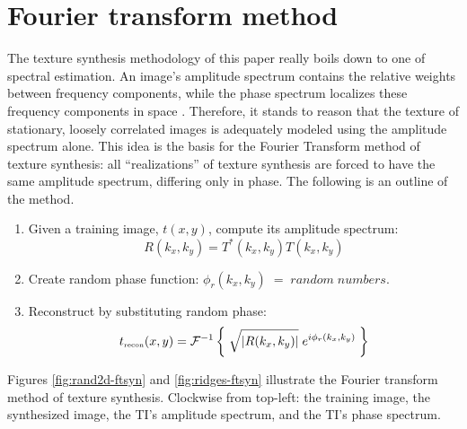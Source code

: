 \section{ Fourier transform method }

	The texture synthesis methodology of this paper really boils down to one of 
	spectral estimation.  An image's amplitude spectrum contains the relative weights 
	between frequency components, while the phase spectrum localizes these frequency 
	components in space {\small \cite[]{castleman}}.   Therefore, it stands to reason that 
	the texture 
	of stationary, loosely correlated images is adequately modeled using the amplitude 
	spectrum alone.  This idea is the basis for the Fourier Transform method of	texture 
	synthesis: all ``realizations'' of texture synthesis are forced to have the same 
	amplitude spectrum, differing only in phase.  The following is an outline of the
	method.

	\begin{enumerate}
		\item Given a training image, $t(x,y)$, compute its amplitude spectrum: 
			\begin{equation}
				R(k_x,k_y) = T^*(k_x,k_y) T(k_x,k_y)  \label{eq:amp-spec}
			\end{equation}
		\item Create random phase function:  $\phi_r(k_x,k_y) \;=\; random \; numbers$.
		\item Reconstruct by substituting random phase:  
			\begin{equation} t_{\tiny \mbox{recon}}(x,y) = 
          {\cal F}^{-1} \left\{ \; \sqrt{\left|R(k_x,k_y)\right|} \; e^{i \phi_r(k_x,k_y) } \; \right\}  \label{eq:ft-recon}
			\end{equation}
	\end{enumerate}

	Figures \ref{fig:rand2d-ftsyn} and \ref{fig:ridges-ftsyn}
	illustrate the Fourier transform method of texture synthesis.  Clockwise from 
	top-left: the training image, the synthesized image, the TI's amplitude spectrum, 
	and the TI's phase spectrum.  


